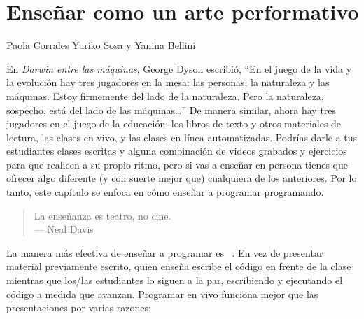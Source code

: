 \chapter{Enseñar como un arte performativo}\label{s:performance}

\begin{reviewer}
{Paola Corrales}
{Yuriko Sosa y Yanina Bellini}
\end{reviewer}

En \emph{Darwin entre las máquinas},
George Dyson escribió,
``En el juego de la vida y la evolución hay tres jugadores en la mesa:
las personas, la naturaleza y las máquinas.
Estoy firmemente del lado de la naturaleza.
Pero la naturaleza, sospecho, está del lado de las máquinas{\ldots}''
De manera similar, ahora hay tres jugadores en el juego de la educación:
los libros de texto y otros materiales de lectura,
las clases en vivo,
y las clases en línea automatizadas.
Podrías darle a tus estudiantes clases escritas y alguna combinación
de videos grabados y ejercicios para que realicen a su propio ritmo,
pero si vas a enseñar en persona tienes
que ofrecer algo diferente (y con suerte mejor que) cualquiera de los anteriores.
Por lo tanto, este capítulo se enfoca en cómo enseñar a programar programando.


\begin{quote}

  La enseñanza es teatro, no cine. \\
  --- Neal Davis

\end{quote}

La manera más efectiva de enseñar a programar es ~\cite{Rubi2013,Haar2017,Raj2018}.
En vez de presentar material previamente escrito,
quien enseña escribe el código en frente de la clase
mientras que los/las estudiantes lo siguen a la par,
escribiendo y ejecutando el código a medida que avanzan.
Programar en vivo funciona mejor que las presentaciones por varias razones:

